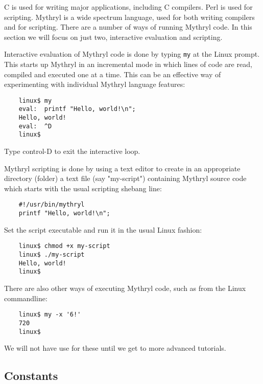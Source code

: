 C is used for writing major applications, including C compilers.  Perl is 
used for scripting.  Mythryl is a wide spectrum language, used for both 
writing compilers and for scripting.  There are a number of ways of 
running Mythryl code.  In this section we will focus on just two, 
interactive evaluation and scripting.

Interactive evaluation of Mythryl code is done by typing {\tt my} at the 
Linux prompt.  This starts up Mythryl in an incremental mode in which 
lines of code are read, compiled and executed  one at a time.  This can 
be an effective way of experimenting with individual Mythryl language 
features:

\begin{verbatim}
    linux$ my
    eval:  printf "Hello, world!\n";
    Hello, world!
    eval:  ^D
    linux$
\end{verbatim}

Type control-D to exit the interactive loop.

Mythryl scripting is done by using a text editor to create in an appropriate 
directory (folder) a text file (say "my-script") containing Mythryl source 
code which starts with the usual scripting shebang line:

\begin{verbatim}
    #!/usr/bin/mythryl
    printf "Hello, world!\n";
\end{verbatim}

Set the script executable and run it in the usual Linux fashion:

\begin{verbatim}
    linux$ chmod +x my-script
    linux$ ./my-script
    Hello, world!
    linux$ 
\end{verbatim}

There are also other ways of executing Mythryl code, such 
as from the Linux commandline:

\begin{verbatim}
    linux$ my -x '6!'
    720
    linux$ 
\end{verbatim}

We will not have use for these until we get to more advanced tutorials.

\cutend*


\subsection{Constants}

